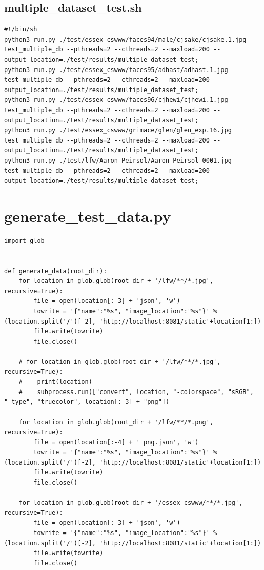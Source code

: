 \documentclass[12pt]{article}
\begin{document}
\begin{appendices}
\subsection{multiple\_dataset\_test.sh}
\begin{lstlisting}
#!/bin/sh
python3 run.py ./test/essex_cswww/faces94/male/cjsake/cjsake.1.jpg test_multiple_db --pthreads=2 --cthreads=2 --maxload=200 --output_location=./test/results/multiple_dataset_test;
python3 run.py ./test/essex_cswww/faces95/adhast/adhast.1.jpg test_multiple_db --pthreads=2 --cthreads=2 --maxload=200 --output_location=./test/results/multiple_dataset_test;
python3 run.py ./test/essex_cswww/faces96/cjhewi/cjhewi.1.jpg test_multiple_db --pthreads=2 --cthreads=2 --maxload=200 --output_location=./test/results/multiple_dataset_test;
python3 run.py ./test/essex_cswww/grimace/glen/glen_exp.16.jpg test_multiple_db --pthreads=2 --cthreads=2 --maxload=200 --output_location=./test/results/multiple_dataset_test;
python3 run.py ./test/lfw/Aaron_Peirsol/Aaron_Peirsol_0001.jpg test_multiple_db --pthreads=2 --cthreads=2 --maxload=200 --output_location=./test/results/multiple_dataset_test;
\end{lstlisting}

\section{generate\_test\_data.py}
\begin{lstlisting}
import glob


def generate_data(root_dir):
    for location in glob.glob(root_dir + '/lfw/**/*.jpg', recursive=True):
        file = open(location[:-3] + 'json', 'w')
        towrite = '{"name":"%s", "image_location":"%s"}' % (location.split('/')[-2], 'http://localhost:8081/static'+location[1:])
        file.write(towrite)
        file.close()

    # for location in glob.glob(root_dir + '/lfw/**/*.jpg', recursive=True):
    #    print(location)
    #    subprocess.run(["convert", location, "-colorspace", "sRGB", "-type", "truecolor", location[:-3] + "png"])

    for location in glob.glob(root_dir + '/lfw/**/*.png', recursive=True):
        file = open(location[:-4] + '_png.json', 'w')
        towrite = '{"name":"%s", "image_location":"%s"}' % (location.split('/')[-2], 'http://localhost:8081/static'+location[1:])
        file.write(towrite)
        file.close()

    for location in glob.glob(root_dir + '/essex_cswww/**/*.jpg', recursive=True):
        file = open(location[:-3] + 'json', 'w')
        towrite = '{"name":"%s", "image_location":"%s"}' % (location.split('/')[-2], 'http://localhost:8081/static'+location[1:])
        file.write(towrite)
        file.close()


\end{lstlisting}
\end{appendices}
\end{document}

